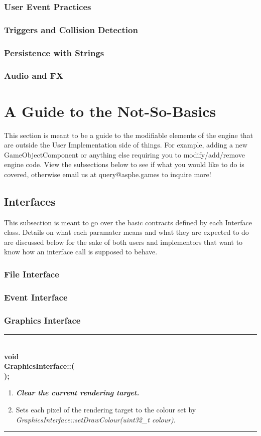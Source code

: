 \documentclass[12pt]{article}
\newcommand{\param}[1]{\indent\phantom{indent} \textbf{#1}\\ }
\newenvironment{func}[4]%
{%
	\noindent\ignorespaces
	\begin{minipage}[b]{\linewidth}
	\rule{\textwidth} {1pt} \\
	\textbf{#1\\#2::{\Large \color{blue}{#3}}(} \\
	\textbf{#4);} \\
	\noindent\ignorespaces
}%
{%
	\ignorespacesafterend
	\rule{\textwidth} {0.01pt} \\
	\end{minipage}
}
\begin{document}
\subsubsection{User Event Practices}
\subsubsection{Triggers and Collision Detection}
\subsubsection{Persistence with Strings}
\subsubsection{Audio and FX}

\section{A Guide to the Not-So-Basics}
This section is meant to be a guide to the modifiable elements of the engine that are outside the User Implementation side of things. For example, adding a new GameObjectComponent or anything else requiring you to modify/add/remove engine code. View the subsections below to see if what you would like to do is covered, otherwise email us at query@asphe.games to inquire more!
\subsection{Interfaces}
This subsection is meant to go over the basic contracts defined by each Interface class. Details on what each paramater means and what they are expected to do are discussed below for the sake of both users and implementors that want to know how an interface call is supposed to behave.
\subsubsection{File Interface}
\subsubsection{Event Interface}
\subsubsection{Graphics Interface}

\begin{func}{void}{GraphicsInterface}{renderClear}
{
}
\begin{enumerate}
\item[]\textit{\textbf{Clear the current rendering target.}}
\item Sets each pixel of the rendering target to the colour set by \textit{GraphicsInterface::setDrawColour(uint32\_t colour)}.
\end{enumerate}
\end{func}
\end{document}
